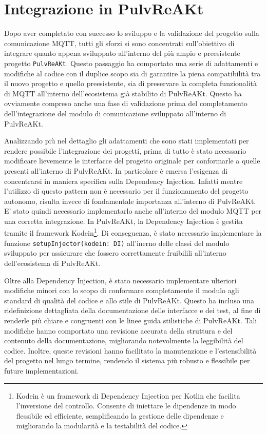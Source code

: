 \documentclass[12pt,a4paper,openright,twoside]{book}
\begin{document}
\section{Integrazione in PulvReAKt}

Dopo aver completato con successo lo sviluppo e la validazione del progetto sulla comunicazione \ac{MQTT}, tutti gli sforzi si sono concentrati sull'obiettivo di 
integrare quanto appena sviluppato all'interno del più ampio e preesistente progetto \texttt{PulvReAKt}. Questo passaggio ha comportato una serie di adattamenti e 
modifiche al codice con il duplice scopo sia di garantire la piena compatibilità tra il nuovo progetto e quello preesistente, sia di preservare la completa 
funzionalità di \ac{MQTT} all'interno dell'ecosistema già stabilito di PulvReAKt. Questo ha ovviamente compreso anche una fase di validazione prima del completamento 
dell'integrazione del modulo di comunicazione sviluppato all'interno di PulvReAKt.

Analizzando più nel dettaglio gli adattamenti che sono stati implementati per rendere possibile l'integrazione dei progetti, 
prima di tutto è stato necessario modificare lievemente le interfacce del progetto originale per conformarle a quelle presenti all'interno di PulvReAKt. 
In particolare è emersa l'esigenza di concentrarsi in maniera specifica sulla Dependency Injection. Infatti mentre l'utilizzo di questo pattern non è necessario 
per il funzionamento del progetto autonomo, risulta invece di fondamentale importanza all'interno di PulvReAKt. E' stato quindi necessario implementarlo anche all'interno 
del modulo MQTT per una corretta integrazione. In PulvReAKt, la Dependency Injection è gestita tramite il framework Kodein\footnote{
    Kodein è un framework di Dependency Injection per Kotlin che facilita l'inversione del controllo. Consente di iniettare le dipendenze in modo flessibile ed efficiente, 
    semplificando la gestione delle dipendenze e migliorando la modularità e la testabilità del codice.
    }. 
Di conseguenza, è stato necessario implementare la funzione \texttt{setupInjector(kodein: DI)} all'inerno delle classi del modulo sviluppato
per assicurare che fossero correttamente fruibilili all'interno dell'ecosistema di PulvReAKt.

Oltre alla Dependency Injection, è stato necessario implementare ulteriori modifiche minori con lo scopo di conformare completamente il modulo agli standard 
di qualità del codice e allo stile di PulvReAKt. Questo ha incluso una ridefinizione dettagliata della documentazione delle interfacce e dei test, 
al fine di renderle più chiare e congruenti con le linee guida stilistiche di PulvReAKt. Tali modifiche hanno comportato una revisione accurata della struttura 
e del contenuto della documentazione, migliorando notevolmente la leggibilità del codice. Inoltre, queste revisioni hanno facilitato la manutenzione e l'estensibilità 
del progetto nel lungo termine, rendendo il sistema più robusto e flessibile per future implementazioni.
\end{document}
